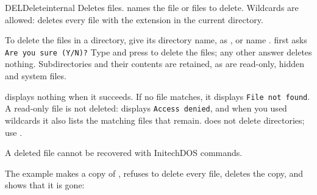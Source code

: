 \begin{DosEntry}{DEL}{Delete}{internal}
\Purpose Deletes files.
\Format {}
\Remarks
{} names the file or files to delete.  Wildcards are
allowed:  deletes every file with the extension 
in the current directory.

To delete the files in a directory, give its directory name, as
, or name .   first asks
\texttt{Are you sure (Y/N)?}  Type  and press  to delete
the files; any other answer deletes nothing.  Subdirectories and their
contents are retained, as are read-only, hidden and system files.

 displays nothing when it succeeds.  If no file matches, it
displays \texttt{File not found}.  A read-only file is not deleted:
 displays \texttt{Access denied}, and when you used wildcards it
also lists the matching files that remain.   does not delete directories; use .

\begin{Important}
A deleted file cannot be recovered with InitechDOS commands.
\end{Important}
\Example
The example makes a copy of , refuses to delete every file,
deletes the copy, and shows that it is gone:
\end{DosEntry}


